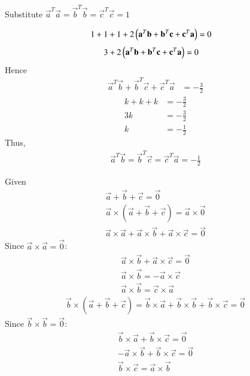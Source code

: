 \documentclass[journal]{IEEEtran}
\begin{document}
Substitute $\vec{a}^T \vec{a} = \vec{b}^T \vec{b} = \vec{c}^T \vec{c} = 1$


\begin{align}
    1 + 1 + 1 + 2\begin{pmatrix}\mathbf{a}^T \mathbf{b} + \mathbf{b}^T \mathbf{c} + \mathbf{c}^T \mathbf{a}\end{pmatrix} &= 0
\end{align}
\begin{align}
    3 + 2\begin{pmatrix}\mathbf{a}^T \mathbf{b} + \mathbf{b}^T \mathbf{c} + \mathbf{c}^T \mathbf{a}\end{pmatrix} &= 0
\end{align}
Hence
\begin{align} 
    \vec{a}^T \vec{b} + \vec{b}^T \vec{c} + \vec{c}^T \vec{a} &= -\frac{3}{2}
\end{align}
\begin{align}
    k + k + k &= -\frac{3}{2} \\ 3k &= -\frac{3}{2} \\ k &= -\frac{1}{2}
\end{align}
Thus,
\begin{align}
    \vec{a}^T \vec{b} = \vec{b}^T \vec{c} = \vec{c}^T \vec{a} = -\frac{1}{2}
\end{align}


Given 
\begin{align}
\vec{a} + \vec{b} + \vec{c} = \vec{0} \\
\vec{a} \times (\vec{a} + \vec{b} + \vec{c}) = \vec{a} \times \vec{0}
\end{align}
\begin{align}
    \vec{a} \times \vec{a} + \vec{a} \times \vec{b} + \vec{a} \times \vec{c} = \vec{0}
\end{align}
Since $\vec{a} \times \vec{a} = \vec{0}$:
\begin{align}
    \vec{a} \times \vec{b} + \vec{a} \times \vec{c} = \vec{0} \\ \vec{a} \times \vec{b} = -\vec{a} \times \vec{c} \\ \vec{a} \times \vec{b} = \vec{c} \times \vec{a}
\end{align}
\begin{align}
\vec{b} \times (\vec{a} + \vec{b} + \vec{c}) = \vec{b} \times \vec{a} + \vec{b} \times \vec{b} + \vec{b} \times \vec{c} = \vec{0}
\end{align}
Since $\vec{b} \times \vec{b} = \vec{0}$:
\begin{align}
    \vec{b} \times \vec{a} + \vec{b} \times \vec{c} = \vec{0} \\ -\vec{a} \times \vec{b} + \vec{b} \times \vec{c} = \vec{0} \\ \vec{b} \times \vec{c} = \vec{a} \times \vec{b}
\end{align}
\end{document}
